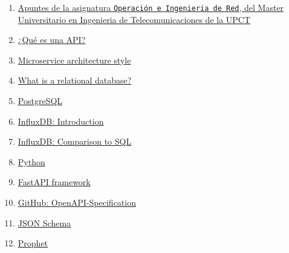\documentclass[a4paper, oneside, 12pt]{book}
\begin{document}
	\begin{enumerate}
		\item 
		\label{bib: apuntes OeIR}
		\href{https://teleco.upct.es/guia-docente/211101007}{Apuntes de la asignatura \texttt{Operación e Ingenieria de Red}, del Master Universitario en Ingenieria de Telecomunicaciones de la UPCT}
		
		\item
		\label{bib: what is api}
		\href{https://aws.amazon.com/es/what-is/api/}{¿Qué es una API?}
		
		\item
		\label{bib: microservices}
		\href{https://learn.microsoft.com/en-us/azure/architecture/guide/architecture-styles/microservices}{Microservice architecture style}
		
		\item
		\label{bib: relational database}
		\href{https://cloud.google.com/learn/what-is-a-relational-database}{What is a relational database?}
				
		\item
		\label{bib: postgresql}
		\href{https://www.postgresql.org/}{PostgreSQL}
		
		\item
		\label{bib: influxdb doc}
		\href{https://www.stackhero.io/en/services/InfluxDB/documentations/Introduction#differences-between-influxdb-and-relational-sql-databases}{InfluxDB: Introduction}
		
		\item
		\label{bib: influxdb doc vs sql}
		\href{https://archive.docs.influxdata.com/influxdb/v1.2/concepts/crosswalk/}{InfluxDB: Comparison to SQL}
		
		\item
		\label{bib: python doc}
		\href{https://www.python.org/}{Python}
		
		\item
		\label{bib: fastapi doc}
		\href{https://fastapi.tiangolo.com/}{FastAPI framework}
		
		\item
		\label{bib: openapi}
		\href{https://github.com/OAI/OpenAPI-Specification}{GitHub: OpenAPI-Specification}
		
		\item
		\label{bib: json schema}
		\href{https://json-schema.org/}{JSON Schema}
		
		\item
		\label{bib: prophet doc}
		\href{https://facebook.github.io/prophet/}{Prophet}
		

\end{enumerate}
\end{document}
